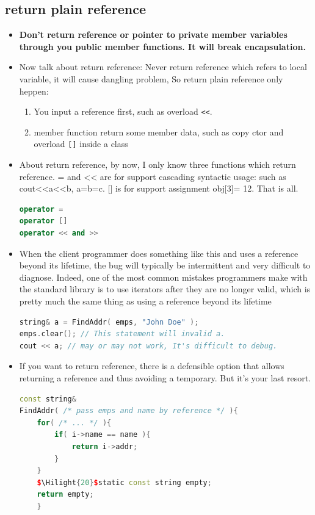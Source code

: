 \documentclass[a4paper,11pt,twoside]{book}
\newcommand{\Hilight}[1]{\makebox[0pt][l]{\color{yellow}\rule[-3pt]{#1em}{11pt}}}
\newcommand{\Hilight}[1]{}
\begin{document}
\subsection{return plain reference} 
\begin{itemize}
	\item \textbf{Don't return reference or pointer to private member variables through you public member functions. It will break encapsulation. }
	
	\item Now talk about return reference: Never return reference which refers to local variable, it will cause dangling problem, So return plain reference only heppen:
	\begin{enumerate}
		\item You input a reference first, such as overload \verb=<<=.
		\item member function return some member data, such as copy ctor and overload \verb=[]= inside a class
	\end{enumerate}
	
	\item About return reference, by now, I only know three functions which return reference. = and << are for support cascading syntactic usage: such as cout<<a<<b, a=b=c.  [] is for support assignment obj[3]= 12.  That is all.
\begin{lstlisting}[frame=single, language=c++]
operator =
operator []
operator << and >>
\end{lstlisting}
	
	\item  When the client programmer does something like this and uses a reference beyond its lifetime, the bug will typically be intermittent and very difficult to diagnose. Indeed, one of the most common mistakes programmers make with the standard library is to use iterators after they are no longer valid, which is pretty much the same thing as using a reference beyond its lifetime
	
\begin{lstlisting}[frame=single, language=c++, mathescape=true]
string& a = FindAddr( emps, "John Doe" );
emps.clear(); // This statement will invalid a.
cout << a; // may or may not work, It's difficult to debug.
\end{lstlisting}
	
	\item If you want to return reference,  there is a defensible option that allows returning a reference and thus avoiding a temporary. But it's your last resort.
\begin{lstlisting}[frame=single, language=c++, mathescape=true]
const string&
FindAddr( /* pass emps and name by reference */ ){
	for( /* ... */ ){
		if( i->name == name ){
			return i->addr;
		}
	}
	$\Hilight{20}$static const string empty;
	return empty;
	}
\end{lstlisting}
	

\end{itemize}
\end{document}
